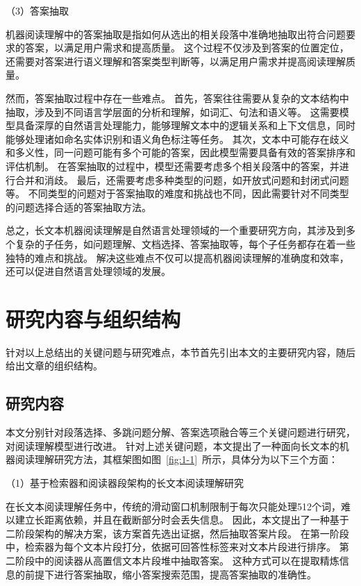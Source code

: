 （3）答案抽取

机器阅读理解中的答案抽取是指如何从选出的相关段落中准确地抽取出符合问题要求的答案，以满足用户需求和提高质量。
这个过程不仅涉及到答案的位置定位，还需要对答案进行语义理解和答案类型判断等\cite{Zhou2021AnOD}，以满足用户需求并提高阅读理解质量。

然而，答案抽取过程中存在一些难点。
首先，答案往往需要从复杂的文本结构中抽取，涉及到不同语言学层面的分析和理解，如词汇、句法和语义等\cite{Sordoni2015ANN,Moschitti2008KernelsOL,Thomas2022AnAH}。
这需要模型具备深厚的自然语言处理能力，能够理解文本中的逻辑关系和上下文信息，同时能够处理诸如命名实体识别和语义角色标注等任务\cite{Shi2019SimpleBM,Lample2016NeuralAF}。
其次，文本中可能存在歧义和多义性，同一问题可能有多个可能的答案，因此模型需要具备有效的答案排序和评估机制\cite{cui-etal-2020-multi}。
在答案抽取的过程中，模型还需要考虑多个相关段落中的答案，并进行合并和消歧。
最后，还需要考虑多种类型的问题，如开放式问题和封闭式问题等。
不同类型的问题对于答案抽取的难度和挑战也不同，因此需要针对不同类型的问题选择合适的答案抽取方法\cite{Zhang2016QuestionAO}。

总之，长文本机器阅读理解是自然语言处理领域的一个重要研究方向，其涉及到多个复杂的子任务，如问题理解、文档选择、答案抽取等，每个子任务都存在着一些独特的难点和挑战。
解决这些难点不仅可以提高机器阅读理解的准确度和效率，还可以促进自然语言处理领域的发展。


\section{研究内容与组织结构}
针对以上总结出的关键问题与研究难点，本节首先引出本文的主要研究内容，随后给出文章的组织结构。

\subsection{研究内容}



本文分别针对段落选择、多跳问题分解、答案选项融合等三个关键问题进行研究，对阅读理解模型进行改进。
针对上述关键问题，本文提出了一种面向长文本的机器阅读理解研究方法，其框架图如图~\ref{fig:1-1}~所示，具体分为以下三个方面：

（1）基于检索器和阅读器段架构的长文本阅读理解研究

在长文本阅读理解任务中，传统的滑动窗口机制限制于每次只能处理512个词，难以建立长距离依赖，并且在截断部分时会丢失信息。
因此，本文提出了一种基于二阶段架构的解决方案，该方案首先选出证据，然后抽取答案片段。
在第一阶段中，检索器为每个文本片段打分，依据可回答性标签来对文本片段进行排序。
第二阶段中的阅读器从高置信文本片段堆中抽取答案。
这种方式可以在提取精炼信息的前提下进行答案抽取，缩小答案搜索范围，提高答案抽取的准确性。

